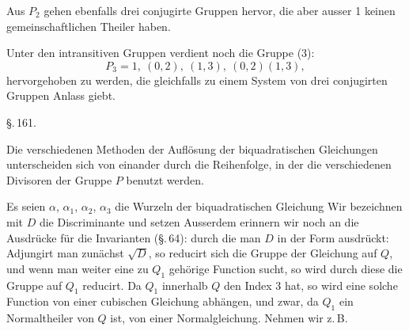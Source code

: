 Aus $P_2$ gehen ebenfalls drei conjugirte Gruppen hervor, die aber ausser 1 keinen gemeinschaftlichen Theiler haben.


Unter den intransitiven Gruppen verdient noch die Gruppe (3):
\[
P_3 = 1, \ (0,2), \ (1,3), \ (0,2)(1,3),
\]
hervorgehoben zu werden, die gleichfalls zu einem System von drei conjugirten Gruppen Anlass giebt.

\begin{center}
\S.\,161.

\end{center}

Die verschiedenen Methoden der Auflösung der biquadratischen Gleichungen unterscheiden sich von einander durch die Reihenfolge, in der die verschiedenen Divisoren der Gruppe $P$ benutzt werden.

Es seien $\alpha$, $\alpha_1$, $\alpha_2$, $\alpha_3$ die Wurzeln der biquadratischen Gleichung
Wir bezeichnen mit $D$ die Discriminante und setzen
Ausserdem erinnern wir noch an die Ausdrücke für die Invarianten (\S.\,64):
durch die man $D$ in der Form ausdrückt:
Adjungirt man zunächst $\sqrt{D}$, so reducirt sich die Gruppe der Gleichung auf $Q$, und wenn man weiter eine zu $Q_1$ gehörige Function sucht, so wird durch diese die Gruppe auf $Q_1$ reducirt. Da $Q_1$ innerhalb $Q$ den Index 3 hat, so wird eine solche Function von einer cubischen Gleichung abhängen, und zwar, da $Q_1$ ein Normaltheiler von $Q$ ist, von einer Normalgleichung. Nehmen wir z.\,B.
